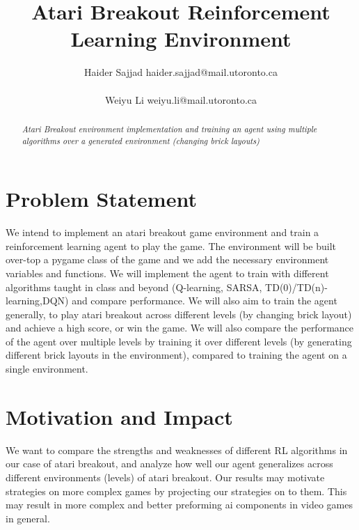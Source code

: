 \documentclass[twoside,11pt]{article}
\title{Atari Breakout Reinforcement Learning Environment}
\author{\name Haider Sajjad \email haider.sajjad@mail.utoronto.ca \\
       \addr 1004076251\\
       \AND
      \name Weiyu Li \email weiyu.li@mail.utoronto.ca \\
       \addr 1003765981}
\begin{document}
\maketitle

\begin{abstract}%
\textit{
Atari Breakout environment implementation and training an agent using multiple algorithms over a generated environment (changing brick layouts)}

\end{abstract}

\section{Problem Statement}

We intend to implement an atari breakout game environment and train a reinforcement learning agent to play the game. The environment will be built over-top a pygame class of the game and we add the necessary environment variables and functions. We will implement the agent to train with different algorithms taught in class and beyond (Q-learning, SARSA, TD(0)/TD(n)-learning,DQN) and compare performance. We will also aim to train the agent generally, to play atari breakout across different levels (by changing brick layout) and achieve a high score, or win the game. We will also compare the performance of the agent over multiple levels by training it over different levels (by generating different brick layouts in the environment), compared to training the agent on a single environment.
\section{Motivation and Impact}
We want to compare the strengths and weaknesses of different RL algorithms in our case of atari breakout, and analyze how well our agent generalizes across different environments (levels) of atari breakout. Our results may motivate strategies on more complex games by projecting our strategies on to them. This may result in more complex and better preforming ai components in video games in general.
\end{document}
